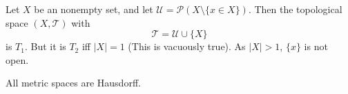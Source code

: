 \begin{example}
	\label{eg: T_2 but not T_1}
	Let $X$ be an nonempty set, and let $\mathcal U = \mathcal P(X \setminus \{x \in X\})$. Then the topological space $(X, \mathcal T)$ with
		$$
		\mathcal T = \mathcal U \cup \{X\}
		$$
		is $T_1$. But it is $T_2$ iff $|X| = 1$ (This is vacuously true). As $|X| > 1$, $\{x\}$ is not open.
\end{example}

\begin{proposition}
	All metric spaces are Hausdorff.
\end{proposition}


